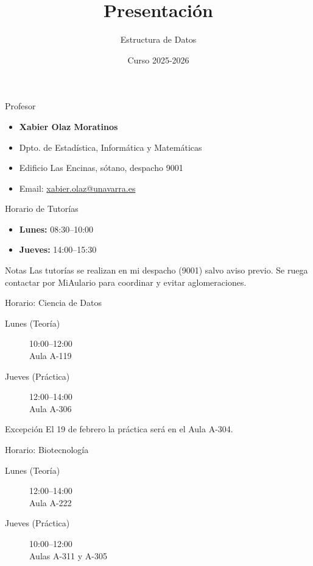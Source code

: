 \documentclass[11pt]{beamer}
\author{Estructura de Datos}
\title{\huge{Presentación}}
\date{Curso 2025-2026}
\begin{document}
\begin{frame}[plain]
	\maketitle
\end{frame}

\begin{frame}{Profesor}
\begin{itemize}
\item \textbf{Xabier Olaz Moratinos}
\item Dpto. de Estadística, Informática y Matemáticas
\item Edificio Las Encinas, sótano, despacho 9001
\item Email: \href{mailto:xabier.olaz@unavarra.es}{xabier.olaz@unavarra.es}
\end{itemize}
\end{frame}

\begin{frame}{Horario de Tutorías}
\begin{itemize}
\item \textbf{Lunes:} 08:30--10:00
\item \textbf{Jueves:} 14:00--15:30
\end{itemize}
\vspace{0.3cm}
\begin{block}{Notas}
Las tutorías se realizan en mi despacho (9001) salvo aviso previo. Se ruega contactar por MiAulario para coordinar y evitar aglomeraciones.
\end{block}
\end{frame}

\begin{frame}{Horario: Ciencia de Datos}
\begin{description}
\item[Lunes (Teoría)] 10:00--12:00 \\ Aula A-119
\item[Jueves (Práctica)] 12:00--14:00 \\ Aula A-306
\end{description}
\vspace{0.2cm}
\footnotesize
\begin{alertblock}{Excepción}
El 19 de febrero la práctica será en el Aula A-304.
\end{alertblock}
\end{frame}

\begin{frame}{Horario: Biotecnología}
\begin{description}
\item[Lunes (Teoría)] 12:00--14:00 \\ Aula A-222
\item[Jueves (Práctica)] 10:00--12:00 \\ Aulas A-311 y A-305
\end{description}
\end{frame}
\end{document}
